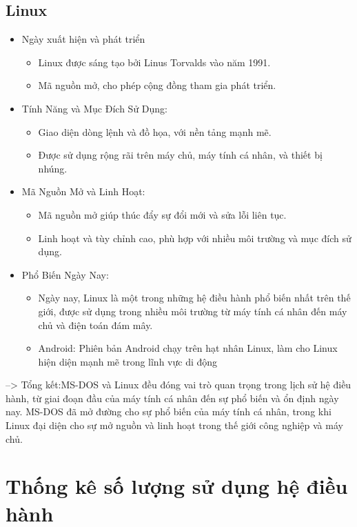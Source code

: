 \documentclass[12pt,a4paper]{article}
\begin{document}
\subsection{Linux}
\begin{itemize}
	\item Ngày xuất hiện và phát triển
		\begin{itemize}
		\item Linux được sáng tạo bởi Linus Torvalds vào năm 1991.
		\item Mã nguồn mở, cho phép cộng đồng tham gia phát triển.
		\end{itemize}
	\item Tính Năng và Mục Đích Sử Dụng:
		\begin{itemize}
		\item Giao diện dòng lệnh và đồ họa, với nền tảng mạnh mẽ.
		\item Được sử dụng rộng rãi trên máy chủ, máy tính cá nhân, và thiết bị nhúng.
		\end{itemize}
	\item Mã Nguồn Mở và Linh Hoạt:
		\begin{itemize}
		\item Mã nguồn mở giúp thúc đẩy sự đổi mới và sửa lỗi liên tục.
		\item Linh hoạt và tùy chỉnh cao, phù hợp với nhiều môi trường và mục đích sử dụng.
		\end{itemize}
	\item Phổ Biến Ngày Nay:
		\begin{itemize}
		\item Ngày nay, Linux là một trong những hệ điều hành phổ biến nhất trên thế giới, được sử dụng trong nhiều môi trường từ máy tính cá nhân đến máy chủ và điện toán đám mây.
		\item Android: Phiên bản Android chạy trên hạt nhân Linux, làm cho Linux hiện diện mạnh mẽ trong lĩnh vực di động
		\end{itemize}
\end{itemize}

	--> Tổng kết:MS-DOS và Linux đều đóng vai trò quan trọng trong lịch sử hệ điều hành, từ giai đoạn đầu của máy tính cá nhân đến sự phổ biến và ổn định ngày nay. MS-DOS đã mở đường cho sự phổ biến của máy tính cá nhân, trong khi Linux đại diện cho sự mở nguồn và linh hoạt trong thế giới công nghiệp và máy chủ.

\section{Thống kê số lượng sử dụng hệ điều hành}
\end{document}

